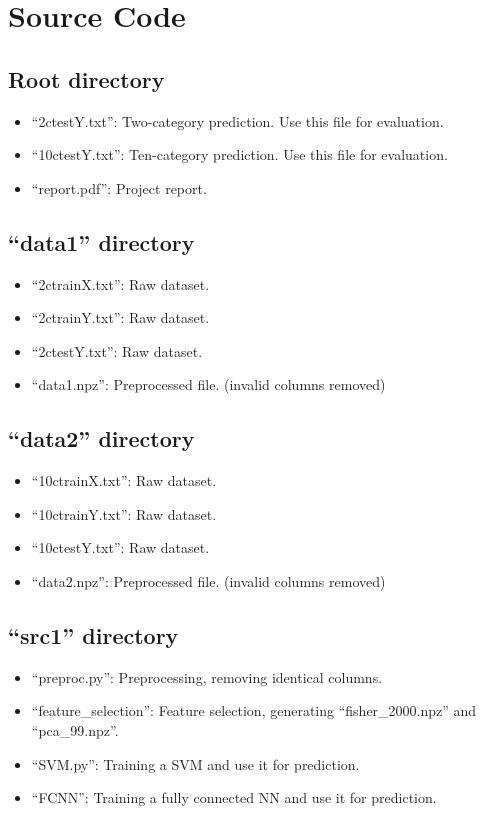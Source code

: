 \documentclass{article}
\begin{document}
\section{Source Code}
{
    \subsection{Root directory}
    {
        \begin{itemize}
            \item ``2ctestY.txt'': Two-category prediction. Use this file for evaluation.
            \item ``10ctestY.txt'': Ten-category prediction. Use this file for evaluation.
            \item ``report.pdf'': Project report.
        \end{itemize}
    }

    \subsection{``data1'' directory}
    {
        \begin{itemize}
            \item ``2ctrainX.txt'': Raw dataset.
            \item ``2ctrainY.txt'': Raw dataset.
            \item ``2ctestY.txt'': Raw dataset.
            \item ``data1.npz'': Preprocessed file. (invalid columns removed)
        \end{itemize}
    }

    \subsection{``data2'' directory}
    {
        \begin{itemize}
            \item ``10ctrainX.txt'': Raw dataset.
            \item ``10ctrainY.txt'': Raw dataset.
            \item ``10ctestY.txt'': Raw dataset.
            \item ``data2.npz'': Preprocessed file. (invalid columns removed)
        \end{itemize}
    }

    \subsection{``src1'' directory}
    {
        \begin{itemize}
            \item ``preproc.py'': Preprocessing, removing identical columns.
            \item ``feature\_selection'': Feature selection, generating ``fisher\_2000.npz'' and ``pca\_99.npz''.
            \item ``SVM.py'': Training a SVM and use it for prediction.
            \item ``FCNN'': Training a fully connected NN and use it for prediction.
        \end{itemize}
    }

}
\end{document}
